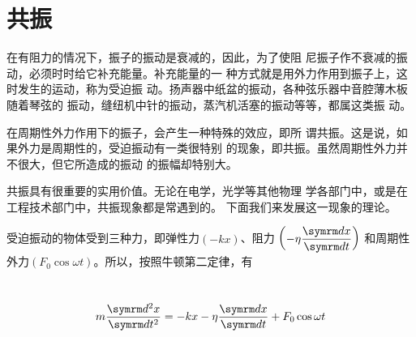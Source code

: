 \section{共振}\label{sec:07.05}

在有阻力的情况下，振子的振动是衰减的，因此，为了使阻
尼振子作不衰减的振动，必须时时给它补充能量。补充能量的一
种方式就是用外力作用到振子上，这时发生的运动，称为受迫振
动。扬声器中纸盆的振动，各种弦乐器中音腔薄木板随着琴弦的
振动，缝纽机中针的振动，蒸汽机活塞的振动等等，都属这类振
动。

在周期性外力作用下的振子，会产生一种特殊的效应，即所
谓共振。这是说，如果外力是周期性的，受迫振动有一类很特别
的现象，即共振。虽然周期性外力并不很大，但它所造成的振动
的振幅却特别大。

共振具有很重要的实用价值。无论在电学，光学等其他物理
学各部门中，或是在工程技术部门中，共振现象都是常遇到的。
下面我们来发展这一现象的理论。

受迫振动的物体受到三种力，即弹性力$ \left( - k x \right) $、阻力
$ \left( - \eta \dfrac { \dif x } { \dif t } \right) $
和周期性外力$ \left( F _ { 0 } \cos \omega t \right) $。所以，按照牛顿第二定律，有

~\vspace{-1.56em}
\begin{equation*}
  m \frac { \dif ^ { 2 } x } { \dif t ^ { 2 } } = - k x - \eta \frac { \dif x } { \dif t } + F _ { 0 } \cos \omega t
\end{equation*}

